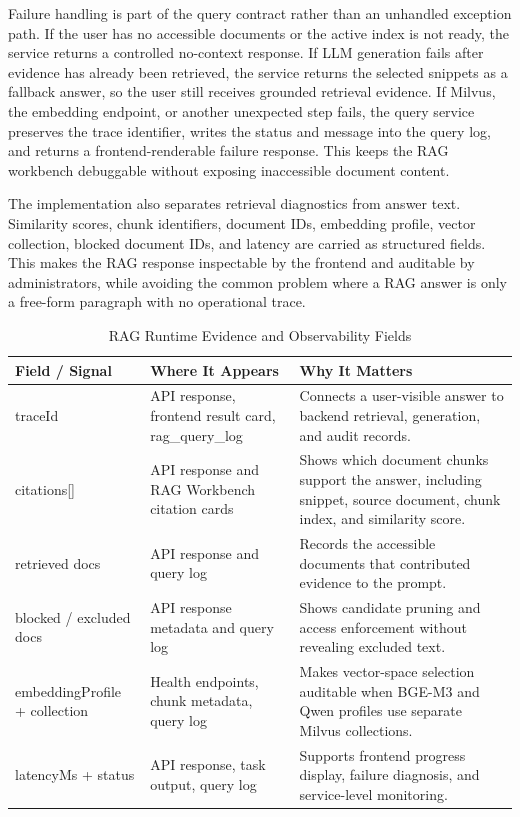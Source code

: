 Failure handling is part of the query contract rather than an unhandled exception path. If the user has no accessible documents or the active index is not ready, the service returns a controlled no-context response. If LLM generation fails after evidence has already been retrieved, the service returns the selected snippets as a fallback answer, so the user still receives grounded retrieval evidence. If Milvus, the embedding endpoint, or another unexpected step fails, the query service preserves the trace identifier, writes the status and message into the query log, and returns a frontend-renderable failure response. This keeps the RAG workbench debuggable without exposing inaccessible document content.

The implementation also separates retrieval diagnostics from answer text. Similarity scores, chunk identifiers, document IDs, embedding profile, vector collection, blocked document IDs, and latency are carried as structured fields. This makes the RAG response inspectable by the frontend and auditable by administrators, while avoiding the common problem where a RAG answer is only a free-form paragraph with no operational trace.

\vspace{3mm}

\begin{table}[H]
\small\singlespacing
\centering
\caption{RAG Runtime Evidence and Observability Fields}
\label{tab:rag-runtime-evidence}
\vspace{2mm}

\begin{tabularx}{\textwidth}{>{\RaggedRight\arraybackslash}p{}>{\RaggedRight\arraybackslash}p{}>{\RaggedRight\arraybackslash}X}
\toprule
\textbf{Field / Signal} & \textbf{Where It Appears} & \textbf{Why It Matters} \\
\midrule
traceId & API response, frontend result card, rag\_query\_log & Connects a user-visible answer to backend retrieval, generation, and audit records. \\
citations[] & API response and RAG Workbench citation cards & Shows which document chunks support the answer, including snippet, source document, chunk index, and similarity score. \\
retrieved docs & API response and query log & Records the accessible documents that contributed evidence to the prompt. \\
blocked / excluded docs & API response metadata and query log & Shows candidate pruning and access enforcement without revealing excluded text. \\
embeddingProfile + collection & Health endpoints, chunk metadata, query log & Makes vector-space selection auditable when BGE-M3 and Qwen profiles use separate Milvus collections. \\
latencyMs + status & API response, task output, query log & Supports frontend progress display, failure diagnosis, and service-level monitoring. \\
\bottomrule
\end{tabularx}
\end{table}

